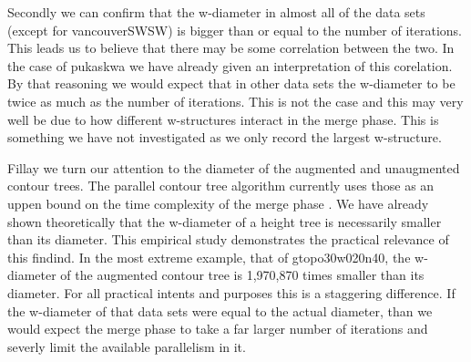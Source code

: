 Secondly we can confirm that the w-diameter in almost all of the data sets (except for vancouverSWSW) is bigger than or equal to the number of iterations. This leads us to believe that there may be some correlation between the two. In the case of pukaskwa we have already given an interpretation of this corelation. By that reasoning we would expect that in other data sets the w-diameter to be twice as much as the number of iterations. This is not the case and this may very well be due to how different w-structures interact in the merge phase. This is something we have not investigated as we only record the largest w-structure.


Fillay we turn our attention to the diameter of the augmented and unaugmented contour trees. The parallel contour tree algorithm currently uses those as an uppen bound on the time complexity of the merge phase \cite{parallel-peak-pruning}. We have already shown theoretically that the w-diameter of a height tree is necessarily smaller than its diameter. This empirical study demonstrates the practical relevance of this findind. In the most extreme example, that of gtopo30w020n40, the w-diameter of the augmented contour tree is 1,970,870 times smaller than its diameter. For all practical intents and purposes this is a staggering difference. If the w-diameter of that data sets were equal to the actual diameter, than we would expect the merge phase to take a far larger number of iterations and severly limit the available parallelism in it.

